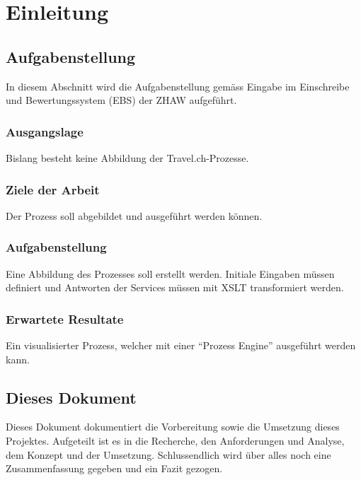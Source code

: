 \chapter{Einleitung}

\section{Aufgabenstellung}
In diesem Abschnitt wird die Aufgabenstellung gemäss Eingabe im Einschreibe und Bewertungssystem (EBS) der ZHAW aufgeführt.

\subsection{Ausgangslage}
Bislang besteht keine Abbildung der Travel.ch-Prozesse.

\subsection{Ziele der Arbeit}
\label{sec:desc:targets}
Der Prozess soll abgebildet und ausgeführt werden können.

\subsection{Aufgabenstellung}
Eine Abbildung des Prozesses soll erstellt werden. Initiale Eingaben müssen definiert und Antworten der Services müssen mit XSLT transformiert werden.

\subsection{Erwartete Resultate}
Ein visualisierter Prozess, welcher mit einer "`Prozess Engine"' ausgeführt werden kann.

\section{Dieses Dokument}
Dieses Dokument dokumentiert die Vorbereitung sowie die Umsetzung dieses Projektes. 
Aufgeteilt ist es in die Recherche, den Anforderungen und Analyse, dem Konzept und der Umsetzung. Schlussendlich wird über alles noch eine Zusammenfassung gegeben und ein Fazit gezogen.